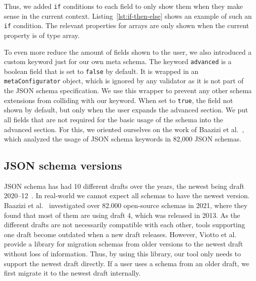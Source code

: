 Thus, we added \texttt{if} conditions to each field to only show them when they make sense in the current context.
Listing~\ref{lst:if-then-else} shows an example of such an \texttt{if} condition.
The relevant properties for arrays are only shown when the current property is of type array.

To even more reduce the amount of fields shown to the user, we also introduced a custom keyword just for our own meta schema.
The keyword \texttt{advanced} is a boolean field that is set to \texttt{false} by default.
It is wrapped in an \texttt{metaConfigurator} object, which is ignored by any validator as it is not part of the JSON schema specification.
We use this wrapper to prevent any other schema extensions from colliding with our keyword.
When set to \texttt{true}, the field not shown by default, but only when the user expands the advanced section.
We put all fields that are not required for the basic usage of the schema into the advanced section.
For this, we oriented ourselves on the work of Baazizi et al.~\cite{baazizi2021empirical}, which analyzed the usage of JSON schema keywords in 82,000 JSON schemas.



\subsection{JSON schema versions}\label{subsec:json-schema-versions}

JSON schema has had 10 different drafts over the years, the newest being draft 2020--12~\cite{jsonschemaJSONSchema}.
In real-world we cannot expect all schemas to have the newest version.
Baazizi et al.~\cite{baazizi2021empirical} investigated over 82.000 open-source schemas in 2021, where they found that most of them are using draft 4, which was released in 2013.
As the different drafts are not necessarily compatible with each other, tools supporting one draft become outdated when a new draft releases.
However, Viotto et al.~\cite{Viotti_Lagoni_2023} provide a library for migration schemas from older versions to the newest draft without loss of information.
Thus, by using this library, our tool only needs to support the newest draft directly.
If a user uses a schema from an older draft, we first migrate it to the newest draft internally.
